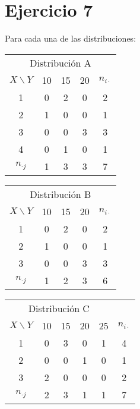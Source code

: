 \documentclass[10pt]{article}
\begin{document}
\section*{Ejercicio 7}

Para cada una de las distribuciones:

\begin{center}
\begin{tabular}{c|ccc|c}
\multicolumn{5}{c}{Distribución A}\\
$X \backslash Y$ & 10 & 15 & 20 & $n_{i\cdot}$\\\hline
1 & 0 & 2 & 0 & 2 \\
2 & 1 & 0 & 0 & 1 \\
3 & 0 & 0 & 3 & 3 \\
4 & 0 & 1 & 0 & 1\\\hline
$n_{\cdot j}$ & 1 & 3 & 3 & 7\\
\end{tabular}
\begin{tabular}{c|ccc|c}
\multicolumn{5}{c}{Distribución B}\\
$X \backslash Y$ & 10 & 15 & 20 & $n_{i\cdot}$\\\hline
1 & 0 & 2 & 0 & 2 \\
2 & 1 & 0 & 0 & 1 \\
3 & 0 & 0 & 3 & 3 \\\hline
$n_{\cdot j}$ & 1 & 2 & 3 & 6\\

\end{tabular}
\begin{tabular}{c|cccc|c}
\multicolumn{5}{c}{Distribución C}\\
$X \backslash Y$ & 10 & 15 & 20 & 25 & $n_{i\cdot}$\\\hline
1 & 0 & 3 & 0 & 1 & 4 \\
2 & 0 & 0 & 1 & 0 & 1 \\
3 & 2 & 0 & 0 & 0 & 2 \\\hline
$n_{\cdot j}$ & 2 & 3 & 1 & 1 & 7 \\

\end{tabular}
\end{center}
\end{document}
